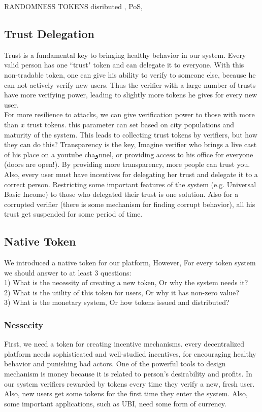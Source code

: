 \documentclass[conference]{IEEEtran}
\begin{document}
RANDOMNESS TOKENS disributed , PoS, 

\subsection{Trust Delegation}
Trust is a fundamental key to bringing healthy behavior in our system. Every valid person has one ``trust" token and can delegate it to everyone. With this non-tradable token, one can give his ability to verify to someone else, because he can not actively verify new users. Thus the verifier with a large number of trusts have more verifying power, leading to slightly more tokens he gives for every new user.
\\
For more resilience to attacks, we can give verification power to those with more than $x$ trust tokens. this parameter can set based on city populations and maturity of the system. This leads to collecting trust tokens by verifiers, but how they can do this? Transparency is the key, Imagine verifier who brings a live cast of his place on a youtube chaوnnel, or providing access to his office for everyone (doors are open!). By providing more transparency, more people can trust you.
\\
Also, every user must have incentives for delegating her trust and delegate it to a correct person. Restricting some important features of the system (e.g. Universal Basic Income) to those who delegated their trust is one solution. Also for a corrupted verifier (there is some mechanism for finding corrupt behavior), all his trust get suspended for some period of time.




\subsection{Native Token}
We introduced a native token for our platform, However, For every  token system we should answer to at least 3 questions:
\\
1) What is the necessity of creating a new token, Or why the system needs it?
\\
2) What is the utility of this token for users, Or why it has non-zero value?
\\
3) What is the monetary system, Or how tokens issued and distributed?
\\
\subsubsection{Nessecity}
First, we need a token for creating incentive mechanisms. every decentralized platform needs sophisticated and well-studied incentives, for encouraging healthy behavior and punishing bad actors. One of the powerful tools to design mechanism is money because it is related to person's desirability and profits. In our system verifiers rewarded by tokens every time they verify a new, fresh user. Also, new users get some tokens for the first time they enter the system. Also, some important applications, such as UBI, need some form of currency.
\end{document}
